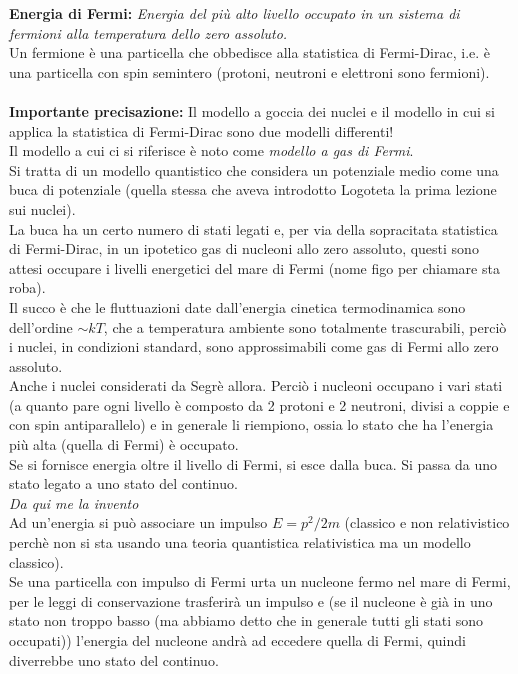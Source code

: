\documentclass[twoside]{article}
\begin{document}
\textbf{Energia di Fermi:} \textit{Energia del più alto livello occupato in un sistema di fermioni alla temperatura dello zero assoluto.}\\
Un fermione è una particella che obbedisce alla statistica di Fermi-Dirac, i.e. è una particella con spin semintero (protoni, neutroni e elettroni sono fermioni).
\\ \\
\textbf{Importante precisazione:} Il modello a goccia dei nuclei e il modello in cui si applica la statistica di Fermi-Dirac sono due modelli differenti!
\\
Il modello a cui ci si riferisce è noto come \textit{modello a gas di Fermi}.
\\
Si tratta di un modello quantistico che considera un potenziale medio come una buca di potenziale (quella stessa che aveva introdotto Logoteta la prima lezione sui nuclei). 
\\
La buca ha un certo numero di stati legati e, per via della sopracitata statistica di Fermi-Dirac, in un ipotetico gas di nucleoni allo zero assoluto, questi sono attesi occupare i livelli energetici del mare di Fermi (nome figo per chiamare sta roba).
\\
Il succo è che le fluttuazioni date dall'energia cinetica termodinamica sono dell'ordine $\sim kT$, che a temperatura ambiente sono totalmente trascurabili, perciò i nuclei, in condizioni standard, sono approssimabili come gas di Fermi allo zero assoluto.
\\
Anche i nuclei considerati da Segrè allora. Perciò i nucleoni occupano i vari stati (a quanto pare ogni livello è composto da 2 protoni e 2 neutroni, divisi a coppie e con spin antiparallelo) e in generale li riempiono, ossia lo stato che ha l'energia più alta (quella di Fermi) è occupato.
\\
Se si fornisce energia oltre il livello di Fermi, si esce dalla buca. Si passa da uno stato legato a uno stato del continuo.
\\
\textit{Da qui me la invento}
\\
Ad un'energia si può associare un impulso $E=p^2/2m$ (classico e non relativistico perchè non si sta usando una teoria quantistica relativistica ma un modello classico).
\\
Se una particella con impulso di Fermi urta un nucleone fermo nel mare di Fermi, per le leggi di conservazione trasferirà un impulso e (se il nucleone è già in uno stato non troppo basso (ma abbiamo detto che in generale tutti gli stati sono occupati)) l'energia del nucleone andrà ad eccedere quella di Fermi, quindi diverrebbe uno stato del continuo.
\end{document}
